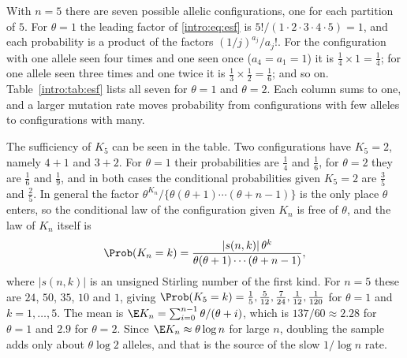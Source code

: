 \begin{example}\label{intro:ex:esf}
With $n=5$ there are seven possible allelic configurations, one for each partition of $5$. For
$\theta=1$ the leading factor of \eqref{intro:eq:esf} is $5!/(1\cdot2\cdot3\cdot4\cdot5)=1$, and
each probability is a product of the factors $(1/j)^{a_j}/a_j!$. For the configuration with one
allele seen four times and one seen once ($a_4=a_1=1$) it is $\tfrac14\times1=\tfrac14$; for one
allele seen three times and one twice it is $\tfrac13\times\tfrac12=\tfrac16$; and so on.
Table~\ref{intro:tab:esf} lists all seven for $\theta=1$ and $\theta=2$. Each column sums to one,
and a larger mutation rate moves probability from configurations with few alleles to
configurations with many.

The sufficiency of $K_5$ can be seen in the table. Two configurations have $K_5=2$, namely $4+1$
and $3+2$. For $\theta=1$ their probabilities are $\tfrac14$ and $\tfrac16$, for $\theta=2$ they
are $\tfrac16$ and $\tfrac19$, and in both cases the conditional probabilities given $K_5=2$ are
$\tfrac35$ and $\tfrac25$. In general the factor $\theta^{K_n}/\{\theta(\theta+1)\cdots(\theta+n-1)\}$
is the only place $\theta$ enters, so the conditional law of the configuration given $K_n$ is free
of $\theta$, and the law of $K_n$ itself is
\begin{equation*}
\Prob(K_n=k)=\frac{|s(n,k)|\,\theta^{k}}{\theta(\theta+1)\cdots(\theta+n-1)},
\end{equation*}
where $|s(n,k)|$ is an unsigned Stirling number of the first kind. For $n=5$ these are $24$, $50$,
$35$, $10$ and $1$, giving $\Prob(K_5=k)=\tfrac15,\tfrac5{12},\tfrac7{24},\tfrac1{12},\tfrac1{120}$
for $\theta=1$ and $k=1,\dots,5$. The mean is
$\E K_n=\sum_{i=0}^{n-1}\theta/(\theta+i)$, which is $137/60\approx2.28$ for $\theta=1$ and
$2.9$ for $\theta=2$. Since $\E K_n\approx\theta\log n$ for large $n$, doubling the sample adds only
about $\theta\log2$ alleles, and that is the source of the slow $1/\log n$ rate.
\end{example}

